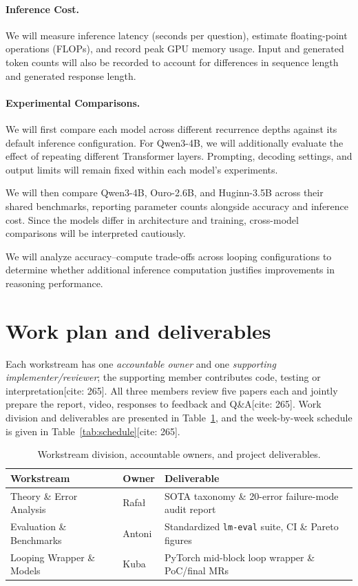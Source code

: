 \documentclass[11pt]{article}
\begin{document}
\paragraph{Inference Cost.}
We will measure inference latency (seconds per question),
estimate floating-point operations (FLOPs), and record
peak GPU memory usage. Input and generated token counts
will also be recorded to account for differences in
sequence length and generated response length.

\paragraph{Experimental Comparisons.}
We will first compare each model across different
recurrence depths against its default inference
configuration. For Qwen3-4B, we will additionally
evaluate the effect of repeating different Transformer
layers. Prompting, decoding settings, and output limits
will remain fixed within each model's experiments.

We will then compare Qwen3-4B, Ouro-2.6B, and
Huginn-3.5B across their shared benchmarks, reporting
parameter counts alongside accuracy and inference cost.
Since the models differ in architecture and training,
cross-model comparisons will be interpreted cautiously.

We will analyze accuracy--compute trade-offs across
looping configurations to determine whether additional
inference computation justifies improvements in
reasoning performance.

\section{Work plan and deliverables}
\label{sec:work_plan}

Each workstream has one \emph{accountable owner} and one \emph{supporting implementer/reviewer}; the supporting member contributes code, testing or interpretation[cite: 265]. All three members review five papers each and jointly prepare the report, video, responses to feedback and Q\&A[cite: 265]. Work division and deliverables are presented in Table~\ref{tab:roles}, and the week-by-week schedule is given in Table~\ref{tab:schedule}[cite: 265].

\begin{table}[h]
\centering
\footnotesize
\setlength{\tabcolsep}{3.5pt}
\begin{tabular}{@{}p{2.8cm}lp{3.4cm}@{}}
\toprule
\textbf{Workstream} & \textbf{Owner} & \textbf{Deliverable} \\
\midrule
Theory \& Error Analysis & Rafał  & SOTA taxonomy \& 20-error failure-mode audit report \\
Evaluation \& Benchmarks & Antoni & Standardized \texttt{lm-eval} suite, CI \& Pareto figures \\
Looping Wrapper \& Models & Kuba   & PyTorch mid-block loop wrapper \& PoC/final MRs \\
\bottomrule
\end{tabular}
\caption{Workstream division, accountable owners, and project deliverables.}
\label{tab:roles}
\end{table}
\end{document}
